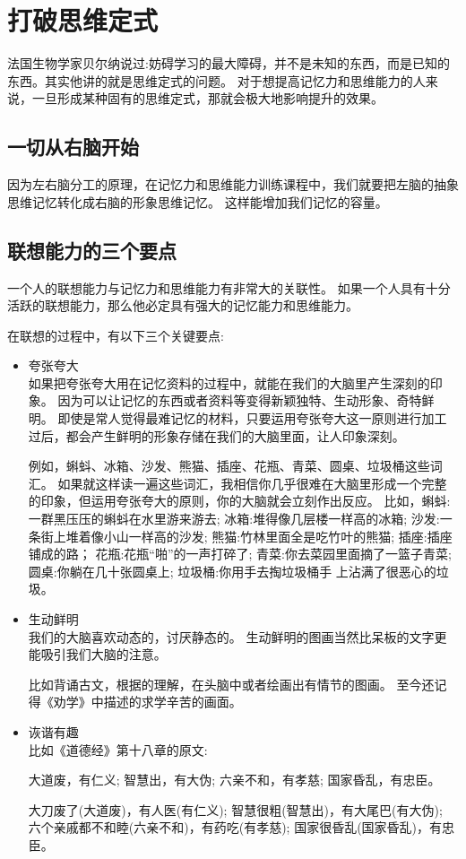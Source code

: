 
\chapter{打破思维定式}

法国生物学家贝尔纳说过:妨碍学习的最大障碍，并不是未知的东西，而是已知的东西。其实他讲的就是思维定式的问题。
对于想提高记忆力和思维能力的人来说，一旦形成某种固有的思维定式，那就会极大地影响提升的效果。

\section{一切从右脑开始}


因为左右脑分工的原理，在记忆力和思维能力训练课程中，我们就要把左脑的抽象思维记忆转化成右脑的形象思维记忆。
这样能增加我们记忆的容量。


\section{联想能力的三个要点}

一个人的联想能力与记忆力和思维能力有非常大的关联性。
如果一个人具有十分活跃的联想能力，那么他必定具有强大的记忆能力和思维能力。

在联想的过程中，有以下三个关键要点:
\begin{itemize}
\item 夸张夸大\\
  如果把夸张夸大用在记忆资料的过程中，就能在我们的大脑里产生深刻的印象。
  因为可以让记忆的东西或者资料等变得新颖独特、生动形象、奇特鲜明。
  即使是常人觉得最难记忆的材料，只要运用夸张夸大这一原则进行加工过后，都会产生鲜明的形象存储在我们的大脑里面，让人印象深刻。

  例如，蝌蚪、冰箱、沙发、熊猫、插座、花瓶、青菜、圆桌、垃圾桶这些词汇。
  如果就这样读一遍这些词汇，我相信你几乎很难在大脑里形成一个完整的印象，但运用夸张夸大的原则，你的大脑就会立刻作出反应。
  比如，蝌蚪:一群黑压压的蝌蚪在水里游来游去;
  冰箱:堆得像几层楼一样高的冰箱;
  沙发:一条街上堆着像小山一样高的沙发;
  熊猫:竹林里面全是吃竹叶的熊猫;
  插座:插座铺成的路；
  花瓶:花瓶“啪”的一声打碎了;
  青菜:你去菜园里面摘了一篮子青菜;
  圆桌:你躺在几十张圆桌上;
  垃圾桶:你用手去掏垃圾桶手 上沾满了很恶心的垃圾。

\item 生动鲜明\\
  我们的大脑喜欢动态的，讨厌静态的。
  生动鲜明的图画当然比呆板的文字更能吸引我们大脑的注意。

  比如背诵古文，根据的理解，在头脑中或者绘画出有情节的图画。
  至今还记得《劝学》中描述的求学辛苦的画面。

\item 诙谐有趣\\
  比如《道德经》第十八章的原文:
  \begin{tcolorbox}
    大道废，有仁义; 智慧出，有大伪; 六亲不和，有孝慈; 国家昏乱，有忠臣。
  \end{tcolorbox}
  大刀废了(大道废)，有人医(有仁义); 智慧很粗(智慧出)，有大尾巴(有大伪); 六个亲戚都不和睦(六亲不和)，有药吃(有孝慈); 国家很昏乱(国家昏乱)，有忠臣。
\end{itemize}

